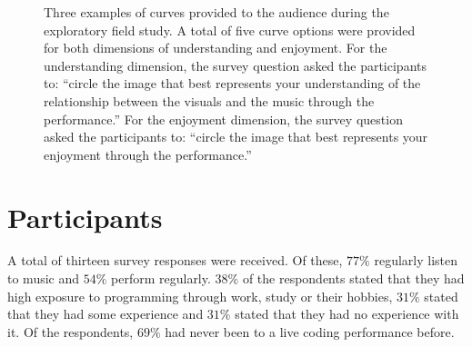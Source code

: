 \begin{figure}
\centering
{}
\hfill
{}
\hfill
{}
\caption[Three examples of curves provided to the audience during the
exploratory field study]{Three examples of curves provided to the audience during the
exploratory field study. A total of five curve options were provided for
both dimensions of understanding and enjoyment. For the understanding
dimension, the survey question asked the participants to: ``circle the
image that best represents your understanding of the relationship
between the visuals and the music through the performance.'' For the
enjoyment dimension, the survey question asked the participants to:
``circle the image that best represents your enjoyment through the
performance.''}
\label{fig:field-study-curves}
\end{figure}


\section{Participants}

A total of thirteen survey responses were received. Of these, $77\%$ regularly listen to music and $54\%$ perform regularly. $38\%$ of the respondents stated that they had high exposure to programming through work, study or their hobbies, $31\%$ stated that they had some experience and $31\%$ stated that they had no experience with it. Of the respondents, $69\%$ had never been to a live coding performance before.

